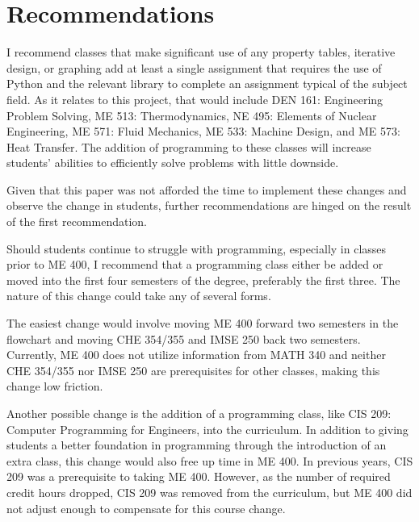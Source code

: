 \section{Recommendations}

I recommend classes that make significant use of any property tables, 
iterative design, or graphing add at least a single assignment that 
requires the use of Python and the relevant library to complete an assignment
typical of the subject field. As it relates to this project, that would include
DEN 161: Engineering Problem Solving, ME 513: Thermodynamics, NE 495: Elements 
of Nuclear Engineering, ME 571: Fluid Mechanics, ME 533: Machine Design, and 
ME 573: Heat Transfer. The addition of programming to these classes will 
increase students' abilities to efficiently solve problems with little downside. 

Given that this paper was not afforded the time to implement these changes
and observe the change in students, further recommendations are hinged on the
result of the first recommendation.

Should students continue to struggle with programming, especially in
classes prior to ME 400, I recommend that a programming class either be 
added or moved into the first four semesters of the degree, preferably 
the first three. The nature of this change could take any of several forms. 

The easiest change would involve moving ME 400 forward two semesters in the
flowchart and moving CHE 354/355 and IMSE 250 back two semesters. Currently,
ME 400 does not utilize information from MATH 340 and neither CHE 354/355 nor
IMSE 250 are prerequisites for other classes, making this change low friction. 

Another possible change is the addition of a programming class, like CIS 209: 
Computer Programming for Engineers, into the curriculum. In addition to 
giving students a better foundation in programming through the introduction
of an extra class, this change would also free up time in ME 400. In previous
years, CIS 209 was a prerequisite to taking ME 400. However, as the number
of required credit hours dropped, CIS 209 was removed from the curriculum,
but ME 400 did not adjust enough to compensate for this course change.

